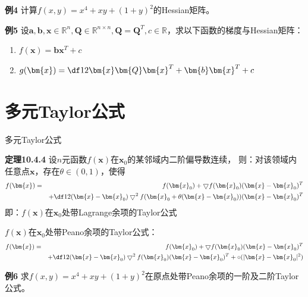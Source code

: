 \begin{frame}
	\linespread{1.2}
	\begin{exampleblock}{{\bf 例4}\hfill}
		计算$f(x,y)=x^4+xy+(1+y)^2$的Hessian矩阵。
	\end{exampleblock}
	\bigskip\pause 
	\begin{exampleblock}{{\bf 例5}\hfill}
		设$\bm{a},\bm{b},\bm{x}\in\mathbb{R}^n,\bm{Q}
		\in\mathbb{R}^{n\times n},\bm{Q}=\bm{Q}^T,c\in\mathbb{R}$，求以下函数的梯度与Hessian矩阵：
		\begin{enumerate}
		  \item $f(\bm{x})=\bm{b}\bm{x}^{T}+c$
		  \item $g(\bm{x})=\df 12\bm{x}\bm{Q}\bm{x}^T+\bm{b}\bm{x}^{T}+c$
		\end{enumerate}
	\end{exampleblock}
\end{frame}

\section{多元Taylor公式}

\begin{frame}{多元Taylor公式}
	\linespread{1.2}\pause 
	\begin{block}{{\bf 定理10.4.4}\hfill}
		设$n$元函数$f(\bm{x})$在$\bm{x}_0$的某邻域内二阶偏导数连续，\pause 
		则：对该领域内任意点$\bm{x}$，\pause 存在$\theta\in(0,1)$，\pause 使得
		\begin{eqnarray*}
			f(\bm{x}) & = & f(\bm{x}_0)+\bigtriangledown f(\bm{x}_0)(\bm{x}-\bm{x}_0)^T\\
			& & + \df 12(\bm{x}-\bm{x}_0)\bigtriangledown^2
			f(\bm{x}_0+\theta(\bm{x}-\bm{x}_0))(\bm{x}-\bm{x}_0)^T
 		\end{eqnarray*}\pause 
 		即：{\bb $f(\bm{x})$在$\bm{x}_0$处带Lagrange余项的Taylor公式}
	\end{block}
\end{frame}

\begin{frame}
	\linespread{1.2}
	{\bb $f(\bm{x})$在$\bm{x}_0$处带Peano余项的Taylor公式：}\pause 
	\begin{eqnarray*}
			f(\bm{x}) & = & f(\bm{x}_0)+\bigtriangledown f(\bm{x}_0)(\bm{x}-\bm{x}_0)^T\\
			& & + \df 12(\bm{x}-\bm{x}_0)\bigtriangledown^2
			f(\bm{x}_0)(\bm{x}-\bm{x}_0)^T+\circ(|\bm{x}-\bm{x}_0|^2)
 		\end{eqnarray*}\pause 
	\begin{exampleblock}{{\bf 例6}\hfill}
		求$f(x,y)=x^4+xy+(1+y)^2$在原点处带Peano余项的一阶及二阶Taylor公式。
	\end{exampleblock}
\end{frame}

